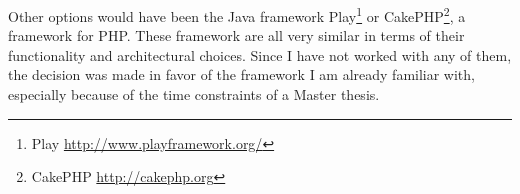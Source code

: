 Other options would have been the Java framework Play\footnote{Play \url{http://www.playframework.org/}} or CakePHP\footnote{CakePHP \url{http://cakephp.org}}, a framework for PHP. These framework are all very similar in terms of their functionality and architectural choices. Since I have not worked with any of them, the decision was made in favor of the framework I am already familiar with, especially because of the time constraints of a Master thesis.  


  

